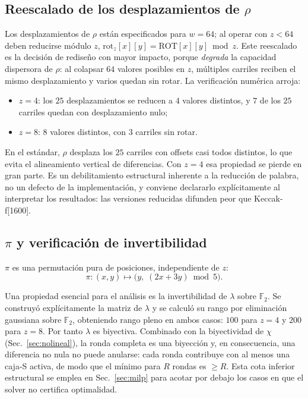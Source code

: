 \documentclass[conference]{IEEEtran}
\newcommand{\Fdos}{\mathbb{F}_2}
\begin{document}
\subsection{Reescalado de los desplazamientos de $\rho$}

Los desplazamientos de $\rho$ están especificados para $w=64$; al operar con $z<64$
deben reducirse módulo $z$, $\mathrm{rot}_z[x][y]=\mathrm{ROT}[x][y]\bmod z$. Este
reescalado es la decisión de rediseño con mayor impacto, porque \emph{degrada} la
capacidad dispersora de $\rho$: al colapsar $64$ valores posibles en $z$, múltiples
carriles reciben el mismo desplazamiento y varios quedan sin rotar. La verificación
numérica arroja:
\begin{itemize}
\item $z=4$: los $25$ desplazamientos se reducen a $4$ valores distintos, y $7$ de los
$25$ carriles quedan con desplazamiento nulo;
\item $z=8$: $8$ valores distintos, con $3$ carriles sin rotar.
\end{itemize}
En el estándar, $\rho$ desplaza los $25$ carriles con offsets casi todos distintos, lo
que evita el alineamiento vertical de diferencias. Con $z=4$ esa propiedad se pierde en
gran parte. Es un debilitamiento estructural inherente a la reducción de palabra, no un
defecto de la implementación, y conviene declararlo explícitamente al interpretar los
resultados: las versiones reducidas difunden peor que Keccak-f[1600].

\subsection{$\pi$ y verificación de invertibilidad}

$\pi$ es una permutación pura de posiciones, independiente de $z$:
\begin{equation}
\pi:(x,y)\mapsto\bigl(y,\;(2x+3y)\bmod 5\bigr).
\end{equation}

Una propiedad esencial para el análisis es la invertibilidad de $\lambda$ sobre $\Fdos$.
Se construyó explícitamente la matriz de $\lambda$ y se calculó su rango por eliminación
gaussiana sobre $\Fdos$, obteniendo rango pleno en ambos casos: $100$ para $z=4$ y $200$
para $z=8$. Por tanto $\lambda$ es biyectiva. Combinado con la biyectividad de $\chi$
(Sec.~\ref{sec:nolineal}), la ronda completa es una biyección y, en consecuencia, una
diferencia no nula no puede anularse: cada ronda contribuye con al menos una caja-S
activa, de modo que el mínimo para $R$ rondas es $\ge R$. Esta cota inferior estructural
se emplea en Sec.~\ref{sec:milp} para acotar por debajo los casos en que el solver no
certifica optimalidad.
\end{document}
